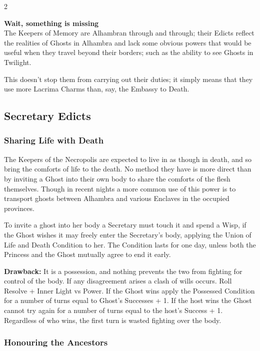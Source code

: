 \begin{multicols}{2}
\begin{mybox}

\noindent\textbf{Wait, something is missing}\\

\noindent The Keepers of Memory are Alhambran through and through; their Edicts reflect the realities of Ghosts in Alhambra and lack some obvious powers that would be useful when they travel beyond their borders; such as the ability to see Ghosts in Twilight.

This doesn’t stop them from carrying out their duties; it simply means that they use more Lacrima Charms than, say, the Embassy to Death. 
\end{mybox}

\subsection*{Secretary Edicts}


\subsubsection*{Sharing Life with Death}

The Keepers of the Necropolis are expected to live in as though in death, and so bring the comforts of life to the death. No method they have is more direct than by inviting a Ghost into their own body to share the comforts of the flesh themselves. Though in recent nights a more common use of this power is to transport ghosts between Alhambra and various Enclaves in the occupied provinces.

To invite a ghost into her body a Secretary must touch it and spend a Wisp, if the Ghost wishes it may freely enter the Secretary’s body, applying the Union of Life and Death Condition to her. The Condition lasts for one day, unless both the Princess and the Ghost mutually agree to end it early. 


\textbf{Drawback:} It is a possession, and nothing prevents the two from fighting for control of the body. If any disagreement arises a clash of wills occurs. Roll Resolve + Inner Light vs Power. If the Ghost wins apply the Possessed Condition for a number of turns equal to Ghost's Successes + 1. If the host wins the Ghost cannot try again for a number of turns equal to the host's Success + 1. Regardless of who wins, the first turn is wasted fighting over the body. 

\subsubsection*{Honouring the Ancestors}


\end{multicols}
